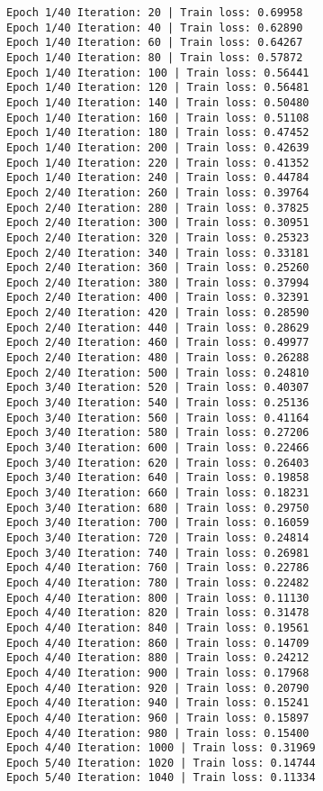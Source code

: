 \documentclass[11pt]{article}
\begin{document}
    \begin{Verbatim}[commandchars=\\\{\}]
Epoch 1/40 Iteration: 20 | Train loss: 0.69958
Epoch 1/40 Iteration: 40 | Train loss: 0.62890
Epoch 1/40 Iteration: 60 | Train loss: 0.64267
Epoch 1/40 Iteration: 80 | Train loss: 0.57872
Epoch 1/40 Iteration: 100 | Train loss: 0.56441
Epoch 1/40 Iteration: 120 | Train loss: 0.56481
Epoch 1/40 Iteration: 140 | Train loss: 0.50480
Epoch 1/40 Iteration: 160 | Train loss: 0.51108
Epoch 1/40 Iteration: 180 | Train loss: 0.47452
Epoch 1/40 Iteration: 200 | Train loss: 0.42639
Epoch 1/40 Iteration: 220 | Train loss: 0.41352
Epoch 1/40 Iteration: 240 | Train loss: 0.44784
Epoch 2/40 Iteration: 260 | Train loss: 0.39764
Epoch 2/40 Iteration: 280 | Train loss: 0.37825
Epoch 2/40 Iteration: 300 | Train loss: 0.30951
Epoch 2/40 Iteration: 320 | Train loss: 0.25323
Epoch 2/40 Iteration: 340 | Train loss: 0.33181
Epoch 2/40 Iteration: 360 | Train loss: 0.25260
Epoch 2/40 Iteration: 380 | Train loss: 0.37994
Epoch 2/40 Iteration: 400 | Train loss: 0.32391
Epoch 2/40 Iteration: 420 | Train loss: 0.28590
Epoch 2/40 Iteration: 440 | Train loss: 0.28629
Epoch 2/40 Iteration: 460 | Train loss: 0.49977
Epoch 2/40 Iteration: 480 | Train loss: 0.26288
Epoch 2/40 Iteration: 500 | Train loss: 0.24810
Epoch 3/40 Iteration: 520 | Train loss: 0.40307
Epoch 3/40 Iteration: 540 | Train loss: 0.25136
Epoch 3/40 Iteration: 560 | Train loss: 0.41164
Epoch 3/40 Iteration: 580 | Train loss: 0.27206
Epoch 3/40 Iteration: 600 | Train loss: 0.22466
Epoch 3/40 Iteration: 620 | Train loss: 0.26403
Epoch 3/40 Iteration: 640 | Train loss: 0.19858
Epoch 3/40 Iteration: 660 | Train loss: 0.18231
Epoch 3/40 Iteration: 680 | Train loss: 0.29750
Epoch 3/40 Iteration: 700 | Train loss: 0.16059
Epoch 3/40 Iteration: 720 | Train loss: 0.24814
Epoch 3/40 Iteration: 740 | Train loss: 0.26981
Epoch 4/40 Iteration: 760 | Train loss: 0.22786
Epoch 4/40 Iteration: 780 | Train loss: 0.22482
Epoch 4/40 Iteration: 800 | Train loss: 0.11130
Epoch 4/40 Iteration: 820 | Train loss: 0.31478
Epoch 4/40 Iteration: 840 | Train loss: 0.19561
Epoch 4/40 Iteration: 860 | Train loss: 0.14709
Epoch 4/40 Iteration: 880 | Train loss: 0.24212
Epoch 4/40 Iteration: 900 | Train loss: 0.17968
Epoch 4/40 Iteration: 920 | Train loss: 0.20790
Epoch 4/40 Iteration: 940 | Train loss: 0.15241
Epoch 4/40 Iteration: 960 | Train loss: 0.15897
Epoch 4/40 Iteration: 980 | Train loss: 0.15400
Epoch 4/40 Iteration: 1000 | Train loss: 0.31969
Epoch 5/40 Iteration: 1020 | Train loss: 0.14744
Epoch 5/40 Iteration: 1040 | Train loss: 0.11334

\end{Verbatim}
\end{document}
